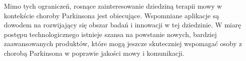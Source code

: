 Mimo tych ograniczeń, rosnące zainteresowanie dziedziną terapii mowy w kontekście choroby Parkinsona jest obiecujące.
Wspomniane aplikacje są dowodem na rozwijający się obszar badań i innowacji w tej dziedzinie.
W miarę postępu technologicznego istnieje szansa na powstanie nowych, bardziej zaawansowanych produktów, które mogą jeszcze skuteczniej wspomagać
osoby z chorobą Parkinsona w poprawie jakości mowy i komunikacji.
